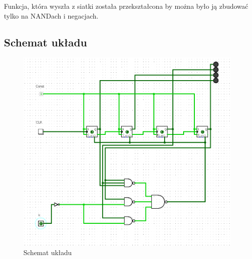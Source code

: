 Funkcja, która wyszła z siatki została przekształcona by można było ją zbudować tylko na NANDach i negacjach.

\newpage

\subsection{Schemat układu}

\begin{figure}[h!]
    \centering
    \includegraphics[width = 12cm]{images/async/async_l.png}
    \caption{Schemat układu}
    \label{fig:my_label}
\end{figure}

\newpage